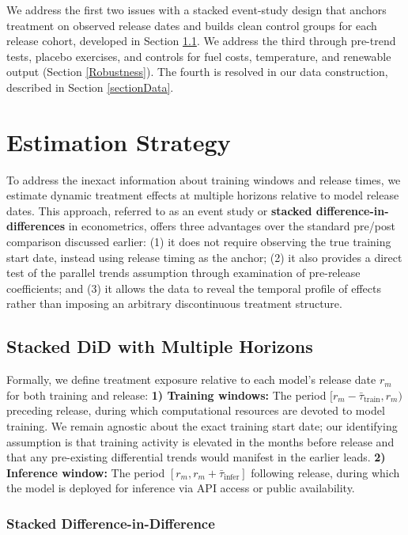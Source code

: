 \documentclass[a4paper,fleqn,longmktitle]{cas-sc}
\begin{document}
We address the first two issues with a stacked event-study design that anchors treatment on observed release dates and builds clean control groups for each release cohort, developed in Section \ref{subsec:eventstudy}. We address the third through pre-trend tests, placebo exercises, and controls for fuel costs, temperature, and renewable output (Section \ref{Robustness}). The fourth is resolved in our data construction, described in Section \ref{sectionData}.

\section{Estimation Strategy}\label{sec:empirical}

To address the inexact information about training windows and release times, we estimate dynamic treatment effects at multiple horizons relative to model release dates. This approach, referred to as an event study or \textbf{stacked difference-in-differences} in econometrics, offers three advantages over the standard pre/post comparison discussed earlier: (1) it does not require observing the true training start date, instead using release timing as the anchor; (2) it also provides a direct test of the parallel trends assumption through examination of pre-release coefficients; and (3) it allows the data to reveal the temporal profile of effects rather than imposing an arbitrary discontinuous treatment structure.

\subsection{Stacked DiD with Multiple Horizons}%
\label{subsec:eventstudy}
Formally, we define treatment exposure relative to each model's release date $r_m$ for both training and release: \textbf{1) Training windows:} The period $[r_m - \bar{\tau}_{\text{train}}, r_m)$ preceding release, during which computational resources are devoted to model training. We remain agnostic about the exact training start date; our identifying assumption is that training activity is elevated in the months before release and that any pre-existing differential trends would manifest in the earlier leads. \textbf{2) Inference window:} The period $[r_m, r_m + \bar{\tau}_{\text{infer}}]$ following release, during which the model is deployed for inference via API access or public availability.


\subsubsection{Stacked Difference-in-Difference}
\end{document}
